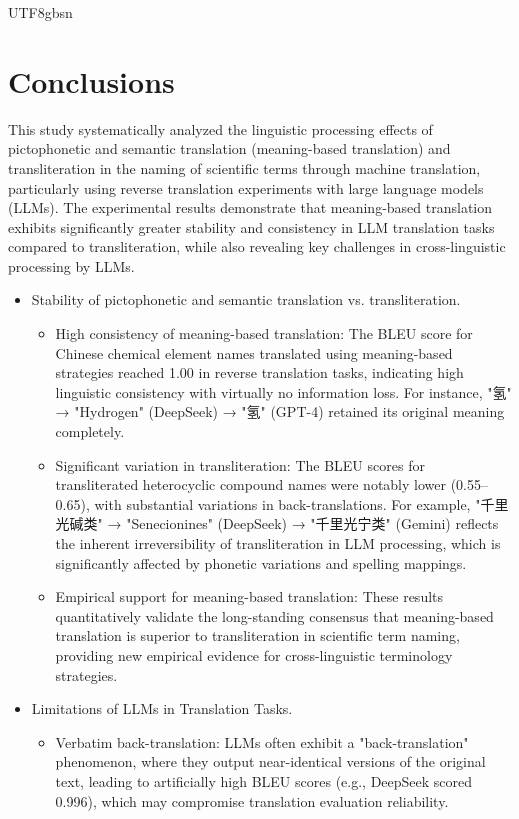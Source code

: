 \documentclass[conference]{IEEEtran}
\begin{document}
\begin{CJK*}{UTF8}{gbsn}
\section{Conclusions}
This study systematically analyzed the linguistic processing effects of pictophonetic and semantic translation (meaning-based translation) and transliteration in the naming of scientific terms through machine translation, particularly using reverse translation experiments with large language models (LLMs). The experimental results demonstrate that meaning-based translation exhibits significantly greater stability and consistency in LLM translation tasks compared to transliteration, while also revealing key challenges in cross-linguistic processing by LLMs.

\begin{itemize}
\item Stability of pictophonetic and semantic translation vs. transliteration. 
\begin{itemize}
\item High consistency of meaning-based translation: The BLEU score for Chinese chemical element names translated using meaning-based strategies reached 1.00 in reverse translation tasks, indicating high linguistic consistency with virtually no information loss. For instance, "氢" → "Hydrogen" (DeepSeek) → "氢" (GPT-4) retained its original meaning completely.
\item Significant variation in transliteration: The BLEU scores for transliterated heterocyclic compound names were notably lower (0.55–0.65), with substantial variations in back-translations. For example, "千里光碱类" → "Senecionines" (DeepSeek) → "千里光宁类" (Gemini) reflects the inherent irreversibility of transliteration in LLM processing, which is significantly affected by phonetic variations and spelling mappings.
\item Empirical support for meaning-based translation: These results quantitatively validate the long-standing consensus that meaning-based translation is superior to transliteration in scientific term naming, providing new empirical evidence for cross-linguistic terminology strategies.
\end{itemize}
\item Limitations of LLMs in Translation Tasks.
\begin{itemize}
\item Verbatim back-translation: LLMs often exhibit a "back-translation" phenomenon, where they output near-identical versions of the original text, leading to artificially high BLEU scores (e.g., DeepSeek scored 0.996), which may compromise translation evaluation reliability.

\end{itemize}
\end{itemize}
\end{CJK*}
\end{document}
